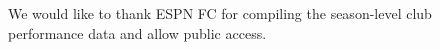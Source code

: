 \documentclass[USenglish]{article}
\begin{document}
\begin{acknowledgement}

We would like to thank ESPN FC for compiling the season-level club performance data and allow public access.

\end{acknowledgement}

\newpage

%

\end{document}
